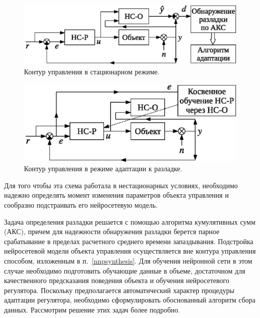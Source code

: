 \begin{figure}[h]
\centering
\includegraphics{steady_state_rus}
\caption{Контур управления в стационарном режиме.}
\label{fig:steady_state_loop}
\end{figure}

\begin{figure}[h]
\centering
\includegraphics{modified_adoption_rus}
\caption{Контур управления в режиме адаптации к разладке.}
\label{fig:modified_adoption_loop}
\end{figure}

Для того чтобы эта схема работала в нестационарных условиях,
необходимо надежно определять момент изменения параметров объекта
управления и сообразно подстраивать его нейросетевую модель.

Задача определения разладки решается с помощью алгоритма кумулятивных
сумм (АКС), причем для надежности обнаружения разладки берется парное
срабатывание в пределах расчетного среднего времени запаздывания.
Подстройка нейросетевой модели объекта управления осуществляется вне
контура управления способом, изложенным в п.~\ref{nnpsynthesis}.  Для
обучения нейронной сети в этом случае необходимо подготовить обучающие
данные в объеме, достаточном для качественного предсказания поведения
объекта и обучения нейросетевого регулятора.  Поскольку предполагается
автоматический характер процедуры адаптации регулятора, необходимо
сформулировать обоснованный алгоритм сбора данных.  Рассмотрим решение
этих задач более подробно.


